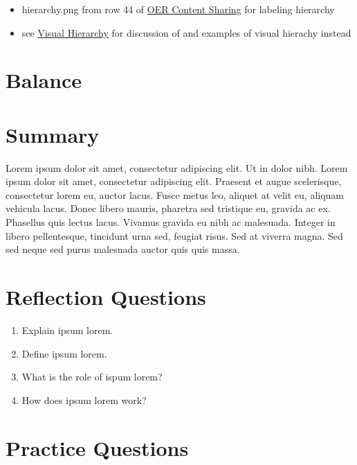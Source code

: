 \documentclass[
]{book}
\providecommand{\tightlist}{%
  \setlength{\itemsep}{0pt}\setlength{\parskip}{0pt}}
\begin{document}
\begin{itemize}
\tightlist
\item
  hierarchy.png from row 44 of \href{https://docs.google.com/spreadsheets/d/1LqzXn00wMeIjHWstNT3tMImNDZirLGc3g72jFOQc_8I/edit\#gid=817407192}{OER Content Sharing} for labeling hierarchy
\item
  see \href{https://www.axismaps.com/guide/visual-hierarchy}{Visual Hierarchy} for discussion of and examples of visual hierachy instead
\end{itemize}

\hypertarget{balance}{%
\section{Balance}\label{balance}}

\hypertarget{summary-13}{%
\section{Summary}\label{summary-13}}

Lorem ipsum dolor sit amet, consectetur adipiscing elit. Ut in dolor nibh. Lorem ipsum dolor sit amet, consectetur adipiscing elit. Praesent et augue scelerisque, consectetur lorem eu, auctor lacus. Fusce metus leo, aliquet at velit eu, aliquam vehicula lacus. Donec libero mauris, pharetra sed tristique eu, gravida ac ex. Phasellus quis lectus lacus. Vivamus gravida eu nibh ac malesuada. Integer in libero pellentesque, tincidunt urna sed, feugiat risus. Sed at viverra magna. Sed sed neque sed purus malesuada auctor quis quis massa.

\hypertarget{reflection-questions-12}{%
\section*{Reflection Questions}\label{reflection-questions-12}}

\begin{enumerate}
\def\labelenumi{\arabic{enumi}.}
\tightlist
\item
  Explain ipsum lorem.
\item
  Define ipsum lorem.
\item
  What is the role of ispum lorem?
\item
  How does ipsum lorem work?
\end{enumerate}

\hypertarget{practice-questions-9}{%
\section*{Practice Questions}\label{practice-questions-9}}
\end{document}
